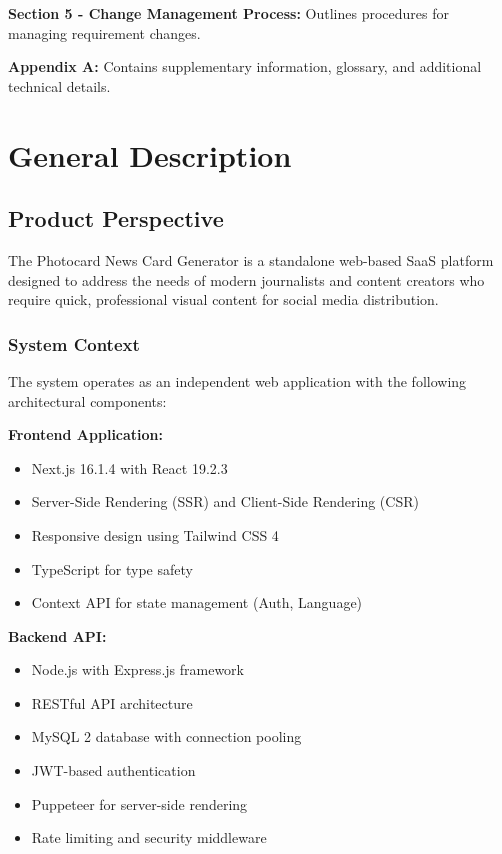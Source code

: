 \documentclass[12pt,a4paper]{article}
\begin{document}
\textbf{Section 5 - Change Management Process:} Outlines procedures for managing requirement changes.

\textbf{Appendix A:} Contains supplementary information, glossary, and additional technical details.

\newpage

\section{General Description}

\subsection{Product Perspective}

The Photocard News Card Generator is a standalone web-based SaaS platform designed to address the needs of modern journalists and content creators who require quick, professional visual content for social media distribution.

\subsubsection{System Context}

The system operates as an independent web application with the following architectural components:

\textbf{Frontend Application:}
\begin{itemize}
    \item Next.js 16.1.4 with React 19.2.3
    \item Server-Side Rendering (SSR) and Client-Side Rendering (CSR)
    \item Responsive design using Tailwind CSS 4
    \item TypeScript for type safety
    \item Context API for state management (Auth, Language)
\end{itemize}

\textbf{Backend API:}
\begin{itemize}
    \item Node.js with Express.js framework
    \item RESTful API architecture
    \item MySQL 2 database with connection pooling
    \item JWT-based authentication
    \item Puppeteer for server-side rendering
    \item Rate limiting and security middleware
\end{itemize}
\end{document}
